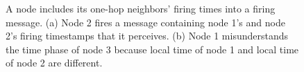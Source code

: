 \begin{figure}[!t]
\centerline{
	\hfil
}
\caption{A node includes its one-hop neighbors' firing times into a firing message. (a) Node 2 fires a message containing node 1's and node 2's firing timestamps that it perceives. (b) Node 1 misunderstands the time phase of node 3 because local time of node 1 and local time of node 2 are different.}
\label{fig:broadcast-problem}
\lofcont
\end{figure}

